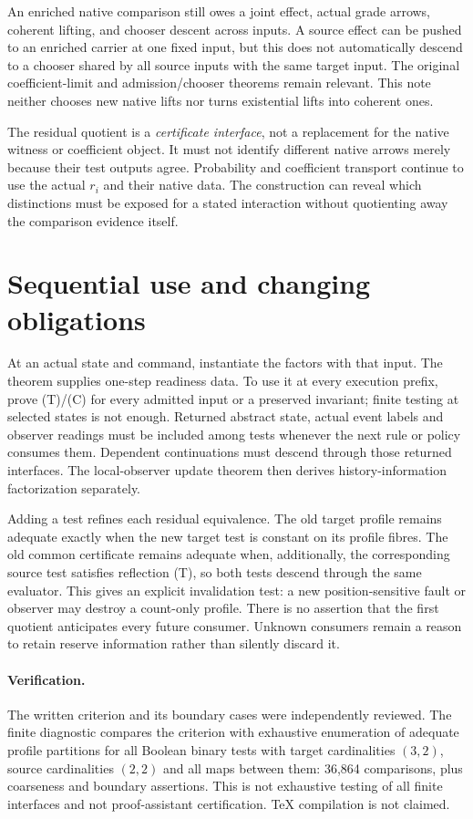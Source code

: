 \documentclass[11pt]{article}
\begin{document}
An enriched native comparison still owes a joint effect, actual grade arrows, coherent lifting, and chooser descent across inputs. A source effect can be pushed to an enriched carrier at one fixed input, but this does not automatically descend to a chooser shared by all source inputs with the same target input. The original coefficient-limit and admission/chooser theorems remain relevant. This note neither chooses new native lifts nor turns existential lifts into coherent ones.

The residual quotient is a \emph{certificate interface}, not a replacement for the native witness or coefficient object. It must not identify different native arrows merely because their test outputs agree. Probability and coefficient transport continue to use the actual $r_i$ and their native data. The construction can reveal which distinctions must be exposed for a stated interaction without quotienting away the comparison evidence itself.

\section{Sequential use and changing obligations}
At an actual state and command, instantiate the factors with that input. The theorem supplies one-step readiness data. To use it at every execution prefix, prove (T)/(C) for every admitted input or a preserved invariant; finite testing at selected states is not enough. Returned abstract state, actual event labels and observer readings must be included among tests whenever the next rule or policy consumes them. Dependent continuations must descend through those returned interfaces. The local-observer update theorem then derives history-information factorization separately.

Adding a test refines each residual equivalence. The old target profile remains adequate exactly when the new target test is constant on its profile fibres. The old common certificate remains adequate when, additionally, the corresponding source test satisfies reflection (T), so both tests descend through the same evaluator. This gives an explicit invalidation test: a new position-sensitive fault or observer may destroy a count-only profile. There is no assertion that the first quotient anticipates every future consumer. Unknown consumers remain a reason to retain reserve information rather than silently discard it.

\paragraph{Verification.} The written criterion and its boundary cases were independently reviewed. The finite diagnostic compares the criterion with exhaustive enumeration of adequate profile partitions for all Boolean binary tests with target cardinalities $(3,2)$, source cardinalities $(2,2)$ and all maps between them: 36,864 comparisons, plus coarseness and boundary assertions. This is not exhaustive testing of all finite interfaces and not proof-assistant certification. TeX compilation is not claimed.
\end{document}
